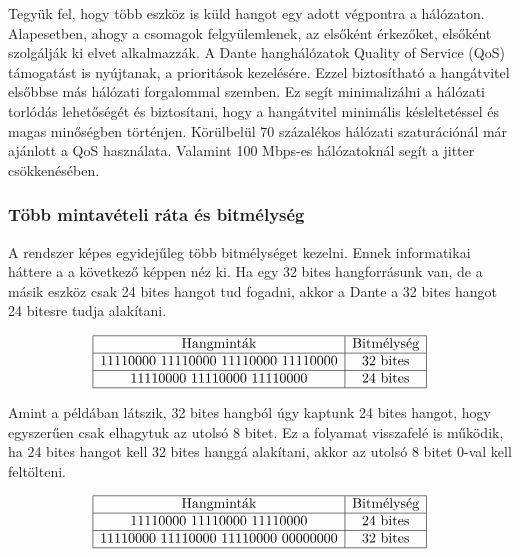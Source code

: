 Tegyük fel, hogy több eszköz is küld hangot egy adott végpontra a hálózaton.
Alapesetben, ahogy a csomagok felgyülemlenek, az elsőként érkezőket, elsőként szolgálják ki elvet alkalmazzák.
A Dante hanghálózatok Quality of Service (QoS)
támogatást is nyújtanak, a prioritások kezelésére.
Ezzel biztosítható a hangátvitel elsőbbse más hálózati forgalommal szemben. Ez segít minimalizálni a hálózati
torlódás lehetőségét és biztosítani, hogy a hangátvitel minimális késleltetéssel
és magas minőségben történjen. 
Körülbelül 70 százalékos hálózati szaturációnál már ajánlott a QoS használata.
Valamint 100 Mbps-es hálózatoknál segít a jitter csökkenésében.

\subsubsection{Több mintavételi ráta és bitmélység}

A rendszer képes egyidejűleg több bitmélységet kezelni. Ennek informatikai háttere a
a következő képpen néz ki. Ha egy 32 bites hangforrásunk van, de a másik eszköz
csak 24 bites hangot tud fogadni, akkor a Dante a 32 bites hangot 24 bitesre tudja 
alakítani.

\begin{align*}
	\begin{array}{|c|c|}
	\hline
	\text{Hangminták} & \text{Bitmélység} \\
	\hline
	\text{11110000 11110000 11110000 11110000} & \text{32 bites} \\
	\hline
	\text{11110000 11110000 11110000} & \text{24 bites} \\
	\hline
	\end{array}
\end{align*}
	
Amint a példában látszik, 32 bites hangból úgy kaptunk 24 bites hangot, 
hogy egyszerűen csak elhagytuk az utolsó 8 bitet. Ez a folyamat visszafelé is működik,
ha 24 bites hangot kell 32 bites hanggá alakítani, akkor az utolsó 8 bitet 0-val kell feltölteni.

\begin{align*}
	\begin{array}{|c|c|}
	\hline
	\text{Hangminták} & \text{Bitmélység} \\
	\hline
	\text{11110000 11110000 11110000} & \text{24 bites} \\
	\hline
	\text{11110000 11110000 11110000 00000000} & \text{32 bites} \\
	\hline
	\end{array}
\end{align*}

